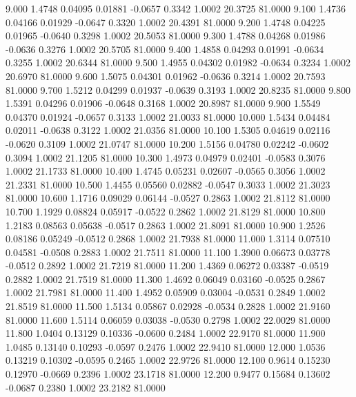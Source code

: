    9.000   1.4748   0.04095   0.01881  -0.0657   0.3342   1.0002  20.3725  81.0000
   9.100   1.4736   0.04166   0.01929  -0.0647   0.3320   1.0002  20.4391  81.0000
   9.200   1.4748   0.04225   0.01965  -0.0640   0.3298   1.0002  20.5053  81.0000
   9.300   1.4788   0.04268   0.01986  -0.0636   0.3276   1.0002  20.5705  81.0000
   9.400   1.4858   0.04293   0.01991  -0.0634   0.3255   1.0002  20.6344  81.0000
   9.500   1.4955   0.04302   0.01982  -0.0634   0.3234   1.0002  20.6970  81.0000
   9.600   1.5075   0.04301   0.01962  -0.0636   0.3214   1.0002  20.7593  81.0000
   9.700   1.5212   0.04299   0.01937  -0.0639   0.3193   1.0002  20.8235  81.0000
   9.800   1.5391   0.04296   0.01906  -0.0648   0.3168   1.0002  20.8987  81.0000
   9.900   1.5549   0.04370   0.01924  -0.0657   0.3133   1.0002  21.0033  81.0000
  10.000   1.5434   0.04484   0.02011  -0.0638   0.3122   1.0002  21.0356  81.0000
  10.100   1.5305   0.04619   0.02116  -0.0620   0.3109   1.0002  21.0747  81.0000
  10.200   1.5156   0.04780   0.02242  -0.0602   0.3094   1.0002  21.1205  81.0000
  10.300   1.4973   0.04979   0.02401  -0.0583   0.3076   1.0002  21.1733  81.0000
  10.400   1.4745   0.05231   0.02607  -0.0565   0.3056   1.0002  21.2331  81.0000
  10.500   1.4455   0.05560   0.02882  -0.0547   0.3033   1.0002  21.3023  81.0000
  10.600   1.1716   0.09029   0.06144  -0.0527   0.2863   1.0002  21.8112  81.0000
  10.700   1.1929   0.08824   0.05917  -0.0522   0.2862   1.0002  21.8129  81.0000
  10.800   1.2183   0.08563   0.05638  -0.0517   0.2863   1.0002  21.8091  81.0000
  10.900   1.2526   0.08186   0.05249  -0.0512   0.2868   1.0002  21.7938  81.0000
  11.000   1.3114   0.07510   0.04581  -0.0508   0.2883   1.0002  21.7511  81.0000
  11.100   1.3900   0.06673   0.03778  -0.0512   0.2892   1.0002  21.7219  81.0000
  11.200   1.4369   0.06272   0.03387  -0.0519   0.2882   1.0002  21.7519  81.0000
  11.300   1.4692   0.06049   0.03160  -0.0525   0.2867   1.0002  21.7981  81.0000
  11.400   1.4952   0.05909   0.03004  -0.0531   0.2849   1.0002  21.8519  81.0000
  11.500   1.5134   0.05867   0.02928  -0.0534   0.2828   1.0002  21.9160  81.0000
  11.600   1.5114   0.06059   0.03038  -0.0530   0.2798   1.0002  22.0029  81.0000
  11.800   1.0404   0.13129   0.10336  -0.0600   0.2484   1.0002  22.9170  81.0000
  11.900   1.0485   0.13140   0.10293  -0.0597   0.2476   1.0002  22.9410  81.0000
  12.000   1.0536   0.13219   0.10302  -0.0595   0.2465   1.0002  22.9726  81.0000
  12.100   0.9614   0.15230   0.12970  -0.0669   0.2396   1.0002  23.1718  81.0000
  12.200   0.9477   0.15684   0.13602  -0.0687   0.2380   1.0002  23.2182  81.0000
